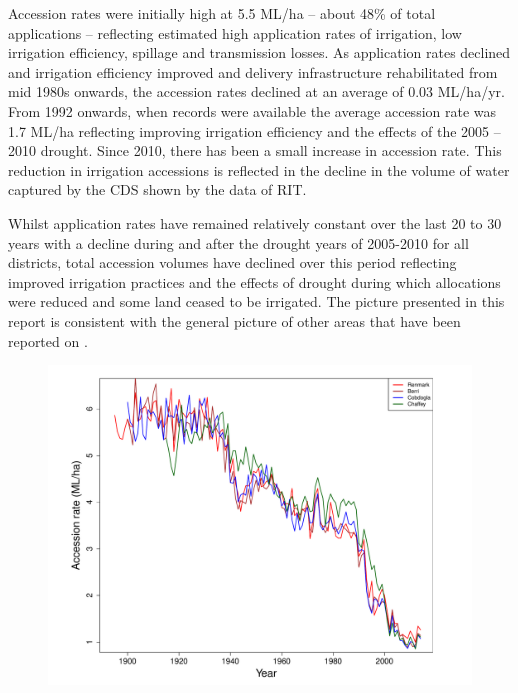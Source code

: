 \documentclass[a4paper, titlepage, 12pt]{article}\usepackage[]{graphicx}\usepackage[]{color}
\makeatletter
\def\maxwidth{ %
  \ifdim\Gin@nat@width>\linewidth
    \linewidth
  \else
    \Gin@nat@width
  \fi
}
\newenvironment{knitrout}{}{} %
\makeatother
\begin{document}
\begin{sffamily}
Accession rates were initially high at 5.5 ML/ha -- about 48\% of total applications -- reflecting estimated high application rates of irrigation, low irrigation efficiency, spillage and transmission losses. As application rates declined and irrigation efficiency improved and delivery infrastructure rehabilitated from mid 1980s onwards, the accession rates declined at an average of 0.03 ML/ha/yr. From 1992 onwards, when records were available the average accession rate was 1.7 ML/ha reflecting improving irrigation efficiency and the effects of the 2005 -- 2010 drought. Since 2010, there has been a small increase in accession rate. This reduction in irrigation accessions is reflected in the decline in the volume of water captured by the CDS shown by the data of RIT.

Whilst application rates have remained relatively constant over the last 20 to 30 years with a decline during and after the drought years of 2005-2010 for all districts, total accession volumes have declined over this period reflecting improved irrigation practices and the effects of drought during which allocations were reduced and some land ceased to be irrigated. The picture presented in this report is consistent with the general picture of other areas that have been reported on \citep{Meissner2014, Meissner2012, Meissner2011a, Meissner2011b, Adams2009}.
   
\begin{figure} 
\begin{knitrout}
\color{fgcolor}
\includegraphics[width=\maxwidth]{../figures/plotacc-1} 


\end{knitrout}
\end{figure}
\end{sffamily}
\end{document}

